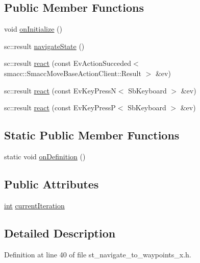 \subsection*{Public Member Functions}
\begin{DoxyCompactItemize}
\item 
void \hyperlink{structStNavigateToWaypointsX_ac5f251c0431495e14c458a298592b663}{on\+Initialize} ()
\item 
sc\+::result \hyperlink{structStNavigateToWaypointsX_a0df2892ed95cae253b2ae0c09c850268}{navigate\+State} ()
\item 
sc\+::result \hyperlink{structStNavigateToWaypointsX_aab643c73ebd67edd5d16e186b0ab527f}{react} (const Ev\+Action\+Succeded$<$ smacc\+::\+Smacc\+Move\+Base\+Action\+Client\+::\+Result $>$ \&ev)
\item 
sc\+::result \hyperlink{structStNavigateToWaypointsX_ab9973901dfb0db2035223ec81d6fe0df}{react} (const Ev\+Key\+PressN$<$ Sb\+Keyboard $>$ \&ev)
\item 
sc\+::result \hyperlink{structStNavigateToWaypointsX_aa2d1a8c49b4c3227201eb300e21e53c1}{react} (const Ev\+Key\+PressP$<$ Sb\+Keyboard $>$ \&ev)
\end{DoxyCompactItemize}
\subsection*{Static Public Member Functions}
\begin{DoxyCompactItemize}
\item 
static void \hyperlink{structStNavigateToWaypointsX_a0698c15b3241c4aa15a4f5380365e72d}{on\+Definition} ()
\end{DoxyCompactItemize}
\subsection*{Public Attributes}
\begin{DoxyCompactItemize}
\item 
\hyperlink{classint}{int} \hyperlink{structStNavigateToWaypointsX_a2f597fd0ee0258ef66506e98d55e8060}{current\+Iteration}
\end{DoxyCompactItemize}


\subsection{Detailed Description}


Definition at line 40 of file st\+\_\+navigate\+\_\+to\+\_\+waypoints\+\_\+x.\+h.



